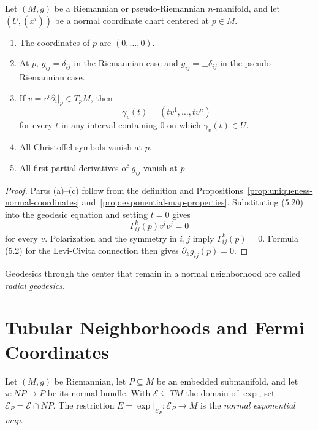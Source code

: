 \begin{proposition}
\label{prop:properties-normal-coordinates}

Let $(M,g)$ be a Riemannian or pseudo-Riemannian $n$-manifold, and let
$(U,(x^i))$ be a normal coordinate chart centered at $p\in M$.
\begin{enumerate}
\item[(a)] The coordinates of $p$ are $(0,\ldots,0)$.
\item[(b)] At $p$, $g_{ij}=\delta_{ij}$ in the Riemannian case and
$g_{ij}=\pm\delta_{ij}$ in the pseudo-Riemannian case.
\item[(c)] If $v=v^i\partial_i|_p\in T_pM$, then
\begin{equation}
\gamma_v(t)=(tv^1,\ldots,tv^n) \tag{5.20}
\end{equation}
for every $t$ in any interval containing $0$ on which $\gamma_v(t)\in U$.
\item[(d)] All Christoffel symbols vanish at $p$.
\item[(e)] All first partial derivatives of $g_{ij}$ vanish at $p$.
\end{enumerate}

\begin{proof}
\sketch
Parts (a)--(c) follow from the definition and
Propositions~\ref{prop:uniqueness-normal-coordinates}
and~\ref{prop:exponential-map-properties}.  Substituting (5.20) into the
geodesic equation and setting $t=0$ gives
\[
\Gamma^k_{ij}(p)v^iv^j=0
\]
for every $v$.  Polarization and the symmetry in $i,j$ imply
$\Gamma^k_{ij}(p)=0$.  Formula (5.2) for the Levi-Civita connection then gives
$\partial_k g_{ij}(p)=0$.
\end{proof}
\end{proposition}

Geodesics through the center that remain in a normal neighborhood are called
\emph{radial geodesics}.

\section{Tubular Neighborhoods and Fermi Coordinates}

Let $(M,g)$ be Riemannian, let $P\subseteq M$ be an embedded submanifold, and
let $\pi:NP\to P$ be its normal bundle.  With $\mathcal E\subseteq TM$ the
domain of $\exp$, set $\mathcal E_P=\mathcal E\cap NP$.  The restriction
$E=\exp|_{\mathcal E_P}:\mathcal E_P\to M$ is the \emph{normal exponential
map}.

